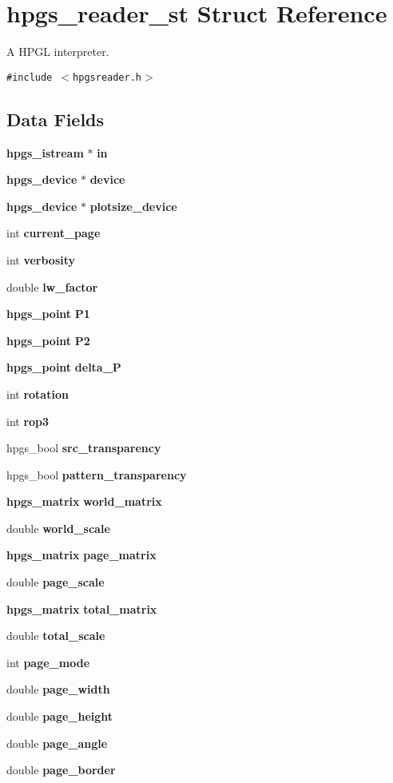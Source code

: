 \section{hpgs\_\-reader\_\-st Struct Reference}
\label{structhpgs__reader__st}
A HPGL interpreter.  


{\tt \#include $<$hpgsreader.h$>$}

\subsection*{Data Fields}
\begin{CompactItemize}
\item 
{\bf hpgs\_\-istream} $\ast$ {\bf in}
\item 
{\bf hpgs\_\-device} $\ast$ {\bf device}
\item 
{\bf hpgs\_\-device} $\ast$ {\bf plotsize\_\-device}
\item 
int {\bf current\_\-page}
\item 
int {\bf verbosity}
\item 
double {\bf lw\_\-factor}
\item 
{\bf hpgs\_\-point} {\bf P1}
\item 
{\bf hpgs\_\-point} {\bf P2}
\item 
{\bf hpgs\_\-point} {\bf delta\_\-P}
\item 
int {\bf rotation}
\item 
int {\bf rop3}
\item 
hpgs\_\-bool {\bf src\_\-transparency}
\item 
hpgs\_\-bool {\bf pattern\_\-transparency}
\item 
{\bf hpgs\_\-matrix} {\bf world\_\-matrix}
\item 
double {\bf world\_\-scale}
\item 
{\bf hpgs\_\-matrix} {\bf page\_\-matrix}
\item 
double {\bf page\_\-scale}
\item 
{\bf hpgs\_\-matrix} {\bf total\_\-matrix}
\item 
double {\bf total\_\-scale}
\item 
int {\bf page\_\-mode}
\item 
double {\bf page\_\-width}
\item 
double {\bf page\_\-height}
\item 
double {\bf page\_\-angle}
\item 
double {\bf page\_\-border}
\item 

\end{CompactItemize}
